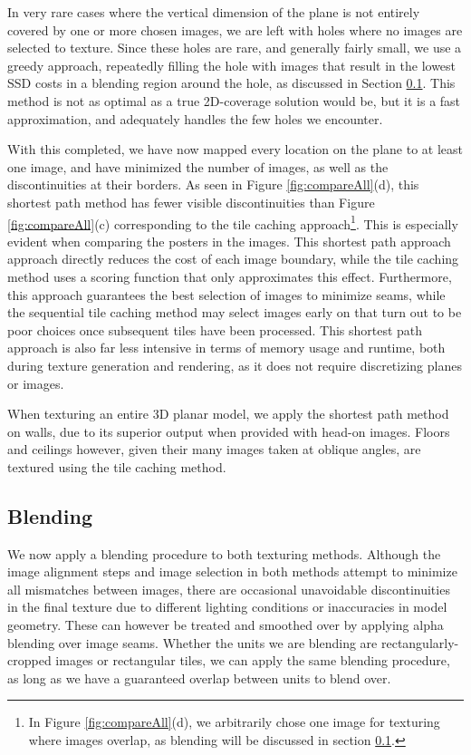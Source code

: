 \documentclass[]{spie}  %
\begin{document}
In very rare cases where the vertical dimension of the plane is not
entirely covered by one or more chosen images, we are left with holes
where no images are selected to texture. Since these holes are rare,
and generally fairly small, we use a greedy approach, repeatedly
filling the hole with images that result in the lowest SSD costs in a
blending region around the hole, as discussed in Section
\ref{sec:blending}. This method is not as optimal as a true
2D-coverage solution would be, but it is a fast approximation, and
adequately handles the few holes we encounter.

With this completed, we have now mapped every location on the plane to
at least one image, and have minimized the number of images, as well
as the discontinuities at their borders. As seen in Figure
\ref{fig:compareAll}(d), this shortest path method has fewer visible
discontinuities than Figure \ref{fig:compareAll}(c) corresponding to
the tile caching approach\footnote{In Figure \ref{fig:compareAll}(d),
  we arbitrarily chose one image for texturing where images overlap,
  as blending will be discussed in section \ref{sec:blending}.}. This
is especially evident when comparing the posters in the images. This
shortest path approach approach directly reduces the cost of each
image boundary, while the tile caching method uses a scoring function
that only approximates this effect. Furthermore, this approach
guarantees the best selection of images to minimize seams, while the
sequential tile caching method may select images early on that turn
out to be poor choices once subsequent tiles have been processed. This
shortest path approach is also far less intensive in terms of memory
usage and runtime, both during texture generation and rendering, as it
does not require discretizing planes or images.

When texturing an entire 3D planar model, we apply the shortest path
method on walls, due to its superior output when provided with head-on
images. Floors and ceilings however, given their many images taken at
oblique angles, are textured using the tile caching method.


\subsection{Blending}
\label{sec:blending}
We now apply a blending procedure to both texturing methods. Although
the image alignment steps and image selection in both methods attempt
to minimize all mismatches between images, there are occasional
unavoidable discontinuities in the final texture due to different
lighting conditions or inaccuracies in model geometry. These can
however be treated and smoothed over by applying alpha blending over
image seams.  Whether the units we are blending are
rectangularly-cropped images or rectangular tiles, we can apply the
same blending procedure, as long as we have a guaranteed overlap
between units to blend over.
\end{document}
